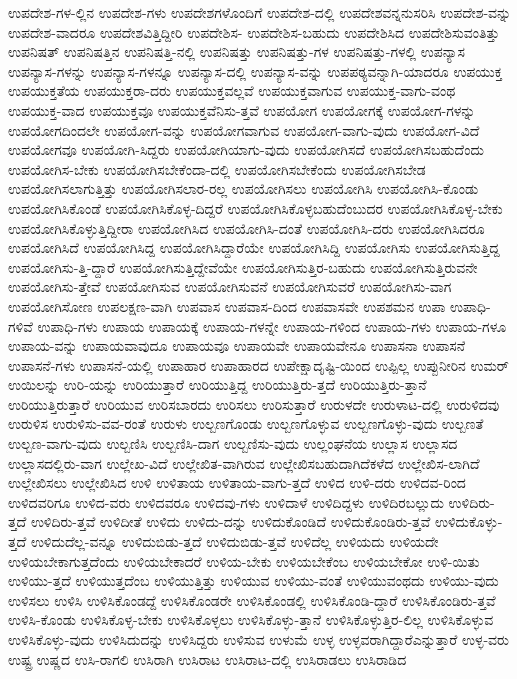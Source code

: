 {ಉಪದೇಶ-ಗಳ-ಲ್ಲಿನ
ಉಪದೇಶ-ಗಳು
ಉಪದೇಶಗಳೊಂದಿಗೆ
ಉಪದೇಶ-ದಲ್ಲಿ
ಉಪದೇಶವನ್ನನುಸರಿಸಿ
ಉಪದೇಶ-ವನ್ನು
ಉಪದೇಶ-ವಾದರೂ
ಉಪದೇಶವಿತ್ತಿದ್ದೀರಿ
ಉಪದೇಶಿಸ-
ಉಪದೇಶಿಸ-ಬಹುದು
ಉಪದೇಶಿಸಿದ
ಉಪದೇಶಿಸುವಂತಿತ್ತು
ಉಪನಿಷತ್
ಉಪನಿಷತ್ತಿನ
ಉಪನಿಷತ್ತಿ-ನಲ್ಲಿ
ಉಪನಿಷತ್ತು
ಉಪನಿಷತ್ತು-ಗಳ
ಉಪನಿಷತ್ತು-ಗಳಲ್ಲಿ
ಉಪನ್ಯಾಸ
ಉಪನ್ಯಾಸ-ಗಳನ್ನು
ಉಪನ್ಯಾಸ-ಗಳನ್ನೂ
ಉಪನ್ಯಾಸ-ದಲ್ಲಿ
ಉಪನ್ಯಾಸ-ವನ್ನು
ಉಪಪಠ್ಯವನ್ನಾಗಿ-ಯಾದರೂ
ಉಪಯುಕ್ತ
ಉಪಯುಕ್ತತೆಯ
ಉಪಯುಕ್ತರಾ-ದರು
ಉಪಯುಕ್ತವಲ್ಲವೆ
ಉಪಯುಕ್ತವಾಗುವ
ಉಪಯುಕ್ತ-ವಾಗು-ವಂಥ
ಉಪಯುಕ್ತ-ವಾದ
ಉಪಯುಕ್ತವೂ
ಉಪಯುಕ್ತವೆನಿಸು-ತ್ತವೆ
ಉಪಯೋಗ
ಉಪಯೋಗಕ್ಕೆ
ಉಪಯೋಗ-ಗಳನ್ನು
ಉಪಯೋಗದಿಂದಲೇ
ಉಪಯೋಗ-ವನ್ನು
ಉಪಯೋಗವಾಗುವ
ಉಪಯೋಗ-ವಾಗು-ವುದು
ಉಪಯೋಗ-ವಿದೆ
ಉಪಯೋಗವೂ
ಉಪಯೋಗಿ-ಸಿದ್ದರು
ಉಪಯೋಗಿಯಾಗು-ವುದು
ಉಪಯೋಗಿಸದೆ
ಉಪಯೋಗಿಸಬಹುದೆಂದು
ಉಪಯೋಗಿಸ-ಬೇಕು
ಉಪಯೋಗಿಸಬೇಕೆಂದಾ-ದಲ್ಲಿ
ಉಪಯೋಗಿಸಬೇಕೆಂದು
ಉಪಯೋಗಿಸಬೇಡ
ಉಪಯೋಗಿಸಲಾಗುತ್ತಿತ್ತು
ಉಪಯೋಗಿಸಲಾರ-ರಲ್ಲ
ಉಪಯೋಗಿಸಲು
ಉಪಯೋಗಿಸಿ
ಉಪಯೋಗಿಸಿ-ಕೊಂಡು
ಉಪಯೋಗಿಸಿಕೊಂಡೆ
ಉಪಯೋಗಿಸಿಕೊಳ್ಳ-ದಿದ್ದರೆ
ಉಪಯೋಗಿಸಿಕೊಳ್ಳಬಹುದೆಂಬುದರ
ಉಪಯೋಗಿಸಿಕೊಳ್ಳ-ಬೇಕು
ಉಪಯೋಗಿಸಿಕೊಳ್ಳುತ್ತಿದ್ದೀರಾ
ಉಪಯೋಗಿಸಿದ
ಉಪಯೋಗಿಸಿ-ದಂತೆ
ಉಪಯೋಗಿಸಿ-ದರು
ಉಪಯೋಗಿಸಿದರೂ
ಉಪಯೋಗಿಸಿದೆ
ಉಪಯೋಗಿಸಿದ್ದ
ಉಪಯೋಗಿಸಿದ್ದಾರೆಯೇ
ಉಪಯೋಗಿಸಿದ್ದಿ
ಉಪಯೋಗಿಸು
ಉಪಯೋಗಿಸುತ್ತಿದ್ದ
ಉಪಯೋಗಿಸು-ತ್ತಿ-ದ್ದಾರೆ
ಉಪಯೋಗಿಸುತ್ತಿದ್ದೇವೆಯೇ
ಉಪಯೋಗಿಸುತ್ತಿರ-ಬಹುದು
ಉಪಯೋಗಿಸುತ್ತಿರುವನೇ
ಉಪಯೋಗಿಸು-ತ್ತೇವೆ
ಉಪಯೋಗಿಸುವ
ಉಪಯೋಗಿಸುವನೆ
ಉಪಯೋಗಿಸುವರೆ
ಉಪಯೋಗಿಸು-ವಾಗ
ಉಪಯೋಗಿಸೋಣ
ಉಪಲಕ್ಷಣ-ವಾಗಿ
ಉಪವಾಸ
ಉಪವಾಸ-ದಿಂದ
ಉಪವಾಸವೇ
ಉಪಶಮನ
ಉಪಾ
ಉಪಾಧಿ-ಗಳಿವೆ
ಉಪಾಧಿ-ಗಳು
ಉಪಾಯ
ಉಪಾಯಕ್ಕೆ
ಉಪಾಯ-ಗಳನ್ನೇ
ಉಪಾಯ-ಗಳಿಂದ
ಉಪಾಯ-ಗಳು
ಉಪಾಯ-ಗಳೂ
ಉಪಾಯ-ವನ್ನು
ಉಪಾಯವಾವುದೂ
ಉಪಾಯವೂ
ಉಪಾಯವೇ
ಉಪಾಯವೇನೂ
ಉಪಾಸನಾ
ಉಪಾಸನೆ
ಉಪಾಸನೆ-ಗಳು
ಉಪಾಸನೆ-ಯಲ್ಲಿ
ಉಪಾಹಾರ
ಉಪಾಹಾರದ
ಉಪೇಕ್ಷಾದೃಷ್ಟಿ-ಯಿಂದ
ಉಪ್ಪಿಲ್ಲ
ಉಪ್ಪುನೀರಿನ
ಉಮರ್
ಉಯಿಲನ್ನು
ಉರಿ-ಯನ್ನು
ಉರಿಯುತ್ತಾರೆ
ಉರಿಯುತ್ತಿದ್ದ
ಉರಿಯುತ್ತಿರು-ತ್ತದೆ
ಉರಿಯುತ್ತಿರು-ತ್ತಾನೆ
ಉರಿಯುತ್ತಿರುತ್ತಾರೆ
ಉರಿಯುವ
ಉರಿಸಬಾರದು
ಉರಿಸಲು
ಉರಿಸುತ್ತಾರೆ
ಉರುಳದೇ
ಉರುಳಾಟ-ದಲ್ಲಿ
ಉರುಳಿದವು
ಉರುಳಿಸ
ಉರುಳಿಸು-ವವ-ರಂತೆ
ಉರುಳು
ಉಲ್ಬಣಗೊಂಡು
ಉಲ್ಬಣಗೊಳ್ಳುವ
ಉಲ್ಬಣಗೊಳ್ಳು-ವುದು
ಉಲ್ಬಣತೆ
ಉಲ್ಬಣ-ವಾಗು-ವುದು
ಉಲ್ಬಣಿಸಿ
ಉಲ್ಬಣಿಸಿ-ದಾಗ
ಉಲ್ಬಣಿಸು-ವುದು
ಉಲ್ಲಂಘನೆಯ
ಉಲ್ಲಾಸ
ಉಲ್ಲಾಸದ
ಉಲ್ಲಾಸದಲ್ಲಿರು-ವಾಗ
ಉಲ್ಲೇಖ-ವಿದೆ
ಉಲ್ಲೇಖಿತ-ವಾಗಿರುವ
ಉಲ್ಲೇಖಿಸಬಹುದಾಗಿದೆಕಳೆದ
ಉಲ್ಲೇಖಿಸ-ಲಾಗಿದೆ
ಉಲ್ಲೇಖಿಸಲು
ಉಲ್ಲೇಖಿಸಿದ
ಉಳಿ
ಉಳಿತಾಯ
ಉಳಿತಾಯ-ವಾಗು-ತ್ತದೆ
ಉಳಿದ
ಉಳಿ-ದರು
ಉಳಿದವ-ರಿಂದ
ಉಳಿದವರಿಗೂ
ಉಳಿದ-ವರು
ಉಳಿದವರೂ
ಉಳಿದವು-ಗಳು
ಉಳಿದಾಳೆ
ಉಳಿದಿದ್ದಳು
ಉಳಿದಿರಬಲ್ಲುದು
ಉಳಿದಿರು-ತ್ತದೆ
ಉಳಿದಿರು-ತ್ತವೆ
ಉಳಿದೀತೆ
ಉಳಿದು
ಉಳಿದು-ದನ್ನು
ಉಳಿದುಕೊಂಡಿದೆ
ಉಳಿದುಕೊಂಡಿರು-ತ್ತವೆ
ಉಳಿದುಕೊಳ್ಳು-ತ್ತದೆ
ಉಳಿದುದೆಲ್ಲ-ವನ್ನೂ
ಉಳಿದುಬಿಡು-ತ್ತದೆ
ಉಳಿದುಬಿಡು-ತ್ತವೆ
ಉಳಿದೆಲ್ಲ
ಉಳಿಯದು
ಉಳಿಯದೇ
ಉಳಿಯಬೇಕಾಗುತ್ತದೆಂದು
ಉಳಿಯಬೇಕಾದರೆ
ಉಳಿಯ-ಬೇಕು
ಉಳಿಯಬೇಕೆಂಬ
ಉಳಿಯಬೇಕೋ
ಉಳಿ-ಯಿತು
ಉಳಿಯು-ತ್ತದೆ
ಉಳಿಯುತ್ತದೆಂಬ
ಉಳಿಯುತ್ತಿತ್ತು
ಉಳಿಯುವ
ಉಳಿಯು-ವಂತೆ
ಉಳಿಯುವಂಥದು
ಉಳಿಯು-ವುದು
ಉಳಿಸಲು
ಉಳಿಸಿ
ಉಳಿಸಿಕೊಂಡದ್ದೆ
ಉಳಿಸಿಕೊಂಡರೇ
ಉಳಿಸಿಕೊಂಡಲ್ಲಿ
ಉಳಿಸಿಕೊಂಡಿ-ದ್ದಾರೆ
ಉಳಿಸಿಕೊಂಡಿರು-ತ್ತವೆ
ಉಳಿಸಿ-ಕೊಂಡು
ಉಳಿಸಿಕೊಳ್ಳ-ಬೇಕು
ಉಳಿಸಿಕೊಳ್ಳಲು
ಉಳಿಸಿಕೊಳ್ಳು-ತ್ತಾನೆ
ಉಳಿಸಿಕೊಳ್ಳುತ್ತಿರ-ಲಿಲ್ಲ
ಉಳಿಸಿಕೊಳ್ಳುವ
ಉಳಿಸಿಕೊಳ್ಳು-ವುದು
ಉಳಿಸಿದುದನ್ನು
ಉಳಿಸಿದ್ದರು
ಉಳಿಸುವ
ಉಳುಮೆ
ಉಳ್ಳ
ಉಳ್ಳವರಾಗಿದ್ದಾರೆಎನ್ನುತ್ತಾರೆ
ಉಳ್ಳ-ವರು
ಉಷ್ಟ್ರ
ಉಷ್ಣದ
ಉಸಿ-ರಾಗಲಿ
ಉಸಿರಾಗಿ
ಉಸಿರಾಟ
ಉಸಿರಾಟ-ದಲ್ಲಿ
ಉಸಿರಾಡಲು
ಉಸಿರಾಡಿದ
}
